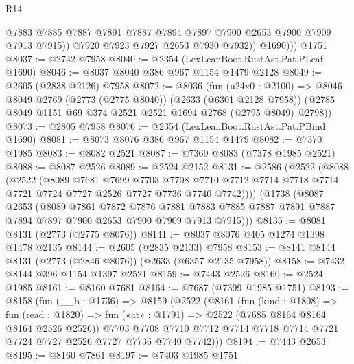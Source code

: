 \begin{lexlean}{R14}
\begin{coremodule}
                @7883
                @7885
                @7887
                @7891
                @7887
                @7894
                @7897
                @7900
                @2653
                @7900
                @7909
                @7913
                @7915))
            @7920
            @7923
            @7927
            @2653
            @7930
            @7932))
          @1690)))
    @1751
@8037 := @2742 @7958
@8040 := @2354 (LexLeanBoot.RustAst.Pat.PLeaf @1690)
@8046 := @8037 @8040 @386 @967 @1154 @1479 @2128
@8049 := @2605 (@2838 @2126) @7958
@8072 := @8036
    (fun (u24x0 : @2100) =>
    @8046
      @8049
      @2769
      (@2773 (@2775 @8040))
      (@2633 (@6301 @2128 @7958))
      (@2785 @8049 @1151 @69 @374 @2521 @2521 @1694 @2768 (@2795 @8049) @2798))
@8073 := @2805 @7958
@8076 := @2354 (LexLeanBoot.RustAst.Pat.PBind @1690)
@8081 := @8073 @8076 @386 @967 @1154 @1479
@8082 := @7370 @1985
@8083 := @8082 @2521
@8087 := @7369 @8083 (@7378 @1985 @2521)
@8088 := @8087 @2526
@8089 := @2524 @2152
@8131 := @2586
    (@2522
      (@8088
        (@2522
          (@8089
            @7681
            @7699
            @7703
            @7708
            @7710
            @7712
            @7714
            @7718
            @7714
            @7721
            @7724
            @7727
            @2526
            @7727
            @7736
            @7740
            @7742))))
    (@1738
      (@8087
        @2653
        (@8089
          @7861
          @7872
          @7876
          @7881
          @7883
          @7885
          @7887
          @7891
          @7887
          @7894
          @7897
          @7900
          @2653
          @7900
          @7909
          @7913
          @7915)))
@8135 := @8081 @8131 (@2773 (@2775 @8076))
@8141 := @8037 @8076 @405 @1274 @1398 @1478 @2135
@8144 := @2605 (@2835 @2133) @7958
@8153 := @8141 @8144 @8131 (@2773 (@2846 @8076)) (@2633 (@6357 @2135 @7958))
@8158 := @7432 @8144 @396 @1154 @1397 @2521
@8159 := @7443 @2526
@8160 := @2524 @1985
@8161 := @8160 @7681
@8164 := @7687 (@7399 @1985 @1751)
@8193 := @8158
    (fun (__b : @1736) =>
    @8159
      (@2522
        (@8161
          (fun (kind : @1808) =>
          fun (read : @1820) => fun («at» : @1791) => @2522 (@7685 @8164 @8164 @8164 @2526 @2526))
          @7703
          @7708
          @7710
          @7712
          @7714
          @7718
          @7714
          @7721
          @7724
          @7727
          @2526
          @7727
          @7736
          @7740
          @7742)))
@8194 := @7443 @2653
@8195 := @8160 @7861
@8197 := @7403 @1985 @1751

\end{coremodule}
\end{lexlean}
